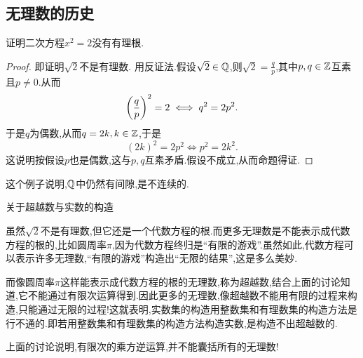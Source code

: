 \subsection{无理数的历史}

\begin{example}
    证明二次方程$x^2=2$没有有理根.
    \begin{proof}
        即证明$\sqrt{2}$不是有理数.
        用反证法.假设$\sqrt{2}\in\mathbb{Q}$,则$\sqrt{2}=\frac{q}{p}$,其中$p,q\in\mathbb{Z}$互素且$p\ne 0$.从而
        \[\left(\frac{q}{p}\right)^2=2\iff q^2=2p^2.\]
        于是$q$为偶数,从而$q=2k,k\in\mathbb{Z}$,于是
        \[(2k)^2=2p^2\iff p^2=2k^2.\]
        这说明按假设$p$也是偶数,这与$p,q$互素矛盾.假设不成立,从而命题得证.
    \end{proof}
\end{example}

\begin{remark}
    这个例子说明,$\mathbb{Q}$中仍然有间隙,是不连续的.
\end{remark}

\begin{note}关于超越数与实数的构造
    
    虽然$\sqrt{2}$不是有理数,但它还是一个代数方程的根.而更多无理数是不能表示成代数方程的根的,比如圆周率$\pi$,因为代数方程终归是“有限的游戏”.虽然如此,代数方程可以表示许多无理数,“有限的游戏”构造出“无限的结果”,这是多么美妙.
    
    而像圆周率$\pi$这样能表示成代数方程的根的无理数,称为超越数,结合上面的讨论知道,它不能通过有限次运算得到.因此更多的无理数,像超越数不能用有限的过程来构造,只能通过无限的过程!这就表明,实数集的构造用整数集和有理数集的构造方法是行不通的.即若用整数集和有理数集的构造方法构造实数,是构造不出超越数的.
\end{note}

\begin{remark}
    上面的讨论说明,有限次的乘方逆运算,并不能囊括所有的无理数!
\end{remark}